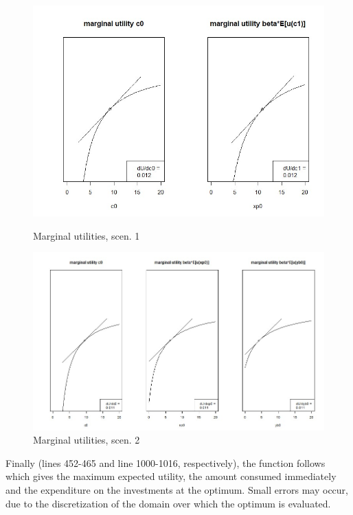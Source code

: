 \begin{figure}[h!]
  \centering
  \begin{minipage}[b]{0.47\textwidth}
    \includegraphics[width=\textwidth, trim = 0 10 0 36,clip]{files/2.3.jpg}
    \caption{Marginal utilities, scen. 1}
  \end{minipage}
  \hfill
  \begin{minipage}[b]{0.51\textwidth}
    \includegraphics[width=\textwidth, trim = 0 0 0 32,clip]{files/3.3.jpg}
    \caption{Marginal utilities, scen. 2}
  \end{minipage}
\end{figure}

\bigskip

\noindent Finally (lines 452-465 and line 1000-1016, respectively), the function follows which gives the maximum expected utility, the amount consumed immediately and the expenditure on the investments at the optimum.
Small errors may occur, due to the discretization of the domain over which the optimum is evaluated.